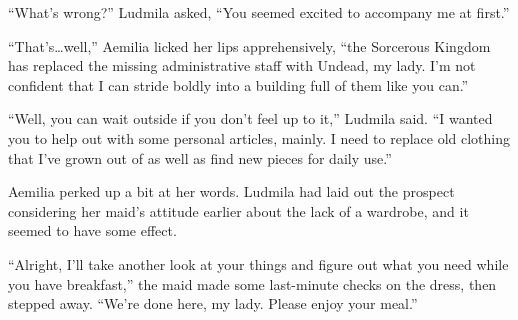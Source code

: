  

“What’s wrong?” Ludmila asked, “You seemed excited to accompany me at first.”

 

“That’s…well,” Aemilia licked her lips apprehensively, “the Sorcerous Kingdom has replaced the missing administrative staff with Undead, my lady. I’m not confident that I can stride boldly into a building full of them like you can.”

 

“Well, you can wait outside if you don’t feel up to it,” Ludmila said. “I wanted you to help out with some personal articles, mainly. I need to replace old clothing that I’ve grown out of as well as find new pieces for daily use.”

 

Aemilia perked up a bit at her words. Ludmila had laid out the prospect considering her maid’s attitude earlier about the lack of a wardrobe, and it seemed to have some effect.

 

“Alright, I’ll take another look at your things and figure out what you need while you have breakfast,” the maid made some last-minute checks on the dress, then stepped away. “We’re done here, my lady. Please enjoy your meal.”